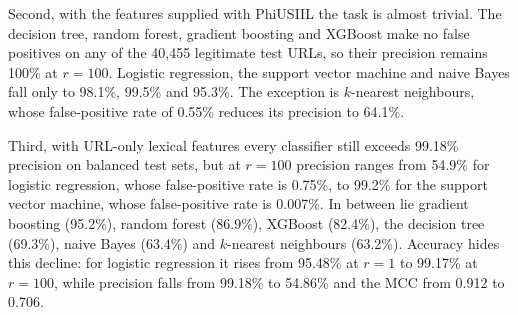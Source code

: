 \documentclass[pdflatex,sn-mathphys-num]{sn-jnl}%
\theoremstyle{thmstyleone}%
\theoremstyle{thmstyletwo}%
\theoremstyle{thmstylethree}%
\begin{document}
Second, with the features supplied with PhiUSIIL the task is almost trivial. The decision tree, random forest, gradient boosting and XGBoost make no false positives on any of the 40,455 legitimate test URLs, so their precision remains 100\% at $r=100$. Logistic regression, the support vector machine and naive Bayes fall only to 98.1\%, 99.5\% and 95.3\%. The exception is $k$-nearest neighbours, whose false-positive rate of 0.55\% reduces its precision to 64.1\%.

Third, with URL-only lexical features every classifier still exceeds 99.18\% precision on balanced test sets, but at $r=100$ precision ranges from 54.9\% for logistic regression, whose false-positive rate is 0.75\%, to 99.2\% for the support vector machine, whose false-positive rate is 0.007\%. In between lie gradient boosting (95.2\%), random forest (86.9\%), XGBoost (82.4\%), the decision tree (69.3\%), naive Bayes (63.4\%) and $k$-nearest neighbours (63.2\%). Accuracy hides this decline: for logistic regression it rises from 95.48\% at $r=1$ to 99.17\% at $r=100$, while precision falls from 99.18\% to 54.86\% and the MCC from 0.912 to 0.706.
\end{document}
